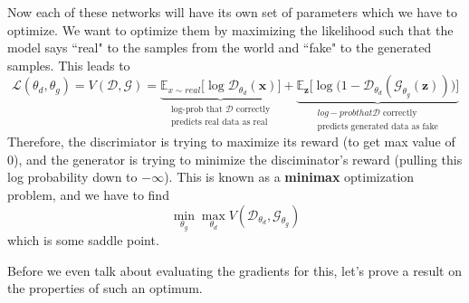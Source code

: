   \begin{definition}
    Now each of these networks will have its own set of parameters which we have to optimize. We want to optimize them by maximizing the likelihood such that the model says ``real" to the samples from the world and ``fake" to the generated samples. This leads to 
    \begin{equation}
      \mathcal{L}(\theta_d, \theta_g) = V(\mathcal{D}, \mathcal{G}) = \underbrace{\mathbb{E}_{x \sim real} \big[ \log \mathcal{D}_{\theta_d}(\mathbf{x}) \big]}_{\substack{\text{log-prob that } \mathcal{D} \text{ correctly} \\ \text{predicts real data as real}}} + \underbrace{\mathbb{E}_{\mathbf{z}} \big[ \log \big( 1 - \mathcal{D}_{\theta_d} ( \mathcal{G}_{\theta_g} (\mathbf{z}))\big)\big]}_{\substack{{log-prob that } \mathcal{D} \text{ correctly} \\ \text{predicts generated data as fake} }}
    \end{equation}
    Therefore, the discrimiator is trying to maximize its reward (to get max value of $0$), and the generator is trying to minimize the disciminator's reward (pulling this log probability down to $-\infty$). This is known as a \textbf{minimax} optimization problem, and we have to find 
    \begin{equation}
      \min_{\theta_g} \max_{\theta_d} V(\mathcal{D}_{\theta_d}, \mathcal{G}_{\theta_g})
    \end{equation}
    which is some saddle point. 
  \end{definition}

  Before we even talk about evaluating the gradients for this, let's prove a result on the properties of such an optimum.   

